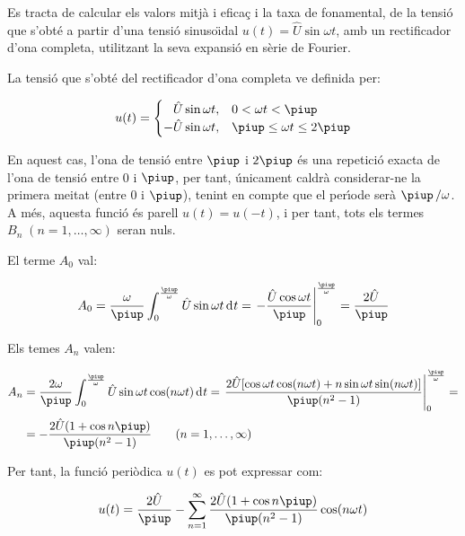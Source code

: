 \begin{exemple}
    Es tracta de calcular els valors mitj\`{a} i efica\c{c} i la taxa de
    fonamental, de la tensi\'{o} que s'obt\'{e} a partir d'una tensi\'{o}
    sinuso\"{\i}dal $u(t) = \hat{U} \sin\omega t$, amb un rectificador d'ona
    completa, utilitzant la seva expansi\'{o} en s\`{e}rie de Fourier.

    La tensi\'{o} que s'obt\'{e} del rectificador d'ona completa ve definida
    per:

    \[
    u(t) = \begin{cases} \phantom{-}\hat{U} \sin\omega t, & 0 < \omega t < \piup\\
           -\hat{U} \sin\omega t, & \piup \leq \omega t \leq 2\piup \end{cases}
    \]

    En aquest cas, l'ona de tensi\'{o} entre $\piup$ i $2\piup$ \'{e}s una repetici\'{o}
    exacta de l'ona de tensi\'{o} entre 0 i $\piup$, per tant, \'{u}nicament
    caldr\`{a} considerar-ne la primera meitat (entre 0 i $\piup$), tenint en
    compte que el per\'{\i}ode ser\`{a} $\piup\,/\omega$. A m\'{e}s, aquesta funci\'{o} \'{e}s
    parell $u(t) = u(-t)$, i per tant, tots els termes
    $B_n\;(n=1,\ldots,\infty)$ seran nuls.

    El terme $A_0$ val:

    \[
    A_0 = \frac{\omega}{\piup} \int_0^{\frac{\piup}{\omega}} \hat{U} \sin
    \omega t \diff t = \left. -\frac{\hat{U} \cos \omega t}{\piup}
    \right|_0^{\frac{\piup}{\omega}} = \frac{2\hat{U}}{\piup}
    \]

    Els temes $A_n$ valen:

    \[
    \begin{split}
    A_n &= \frac{2 \omega}{\piup} \int_0^{\frac{\piup}{\omega}} \hat{U} \sin
    \omega t \cos(n \omega t)\diff t = \left. \frac{2 \hat{U}[ \cos
    \omega t \cos (n \omega t) + n \sin \omega t \sin(n \omega
    t)]}{\piup(n^2-1)} \right|_0^{\frac{\piup}{\omega}}=\\[0.5ex]
    &= -\frac{2\hat{U}(1+\cos n \piup)}{\piup(n^2-1)}
    \qquad(n=1,\ldots,\infty)
    \end{split}
    \]

    Per tant, la funci\'{o} peri\`{o}dica $u(t)$ es pot expressar com:

    \[
        u(t) = \frac{2\hat{U}}{\piup} - \sum_{n=1}^\infty
         \frac{2\hat{U}(1+\cos n \piup)}{\piup(n^2-1)} \cos(n \omega t)
    \]


\end{exemple}
